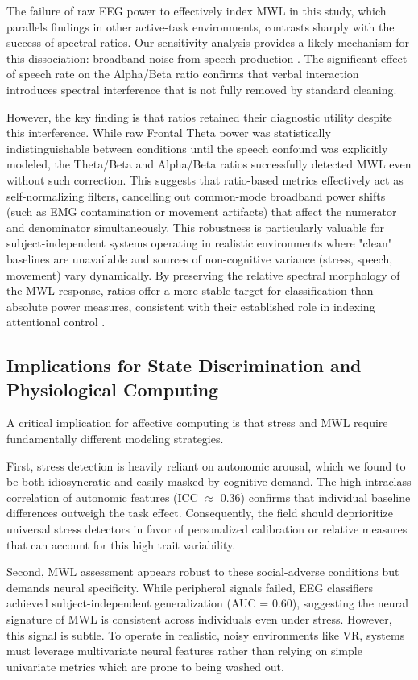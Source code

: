 \documentclass[lettersize,journal]{IEEEtran}
\begin{document}
The failure of raw EEG power to effectively index MWL in this study, which parallels findings in other active-task environments, contrasts sharply with the success of spectral ratios. Our sensitivity analysis provides a likely mechanism for this dissociation: broadband noise from speech production \cite{goncharova_emg_2003}. The significant effect of speech rate on the Alpha/Beta ratio confirms that verbal interaction introduces spectral interference that is not fully removed by standard cleaning. 

However, the key finding is that ratios retained their diagnostic utility despite this interference. While raw Frontal Theta power was statistically indistinguishable between conditions until the speech confound was explicitly modeled, the Theta/Beta and Alpha/Beta ratios successfully detected MWL even without such correction. This suggests that ratio-based metrics effectively act as self-normalizing filters, cancelling out common-mode broadband power shifts (such as EMG contamination or movement artifacts) that affect the numerator and denominator simultaneously. This robustness is particularly valuable for subject-independent systems operating in realistic environments where "clean" baselines are unavailable and sources of non-cognitive variance (stress, speech, movement) vary dynamically. By preserving the relative spectral morphology of the MWL response, ratios offer a more stable target for classification than absolute power measures, consistent with their established role in indexing attentional control \cite{putman_eeg_2014}.

\subsection{Implications for State Discrimination and Physiological Computing}

A critical implication for affective computing is that stress and MWL require fundamentally different modeling strategies.

First, stress detection is heavily reliant on autonomic arousal, which we found to be both idiosyncratic and easily masked by cognitive demand. The high intraclass correlation of autonomic features (ICC $\approx$ 0.36) confirms that individual baseline differences outweigh the task effect. Consequently, the field should deprioritize universal stress detectors in favor of personalized calibration or relative measures that can account for this high trait variability.

Second, MWL assessment appears robust to these social-adverse conditions but demands neural specificity. While peripheral signals failed, EEG classifiers achieved subject-independent generalization (AUC = 0.60), suggesting the neural signature of MWL is consistent across individuals even under stress. However, this signal is subtle. To operate in realistic, noisy environments like VR, systems must leverage multivariate neural features rather than relying on simple univariate metrics which are prone to being washed out.
\end{document}
